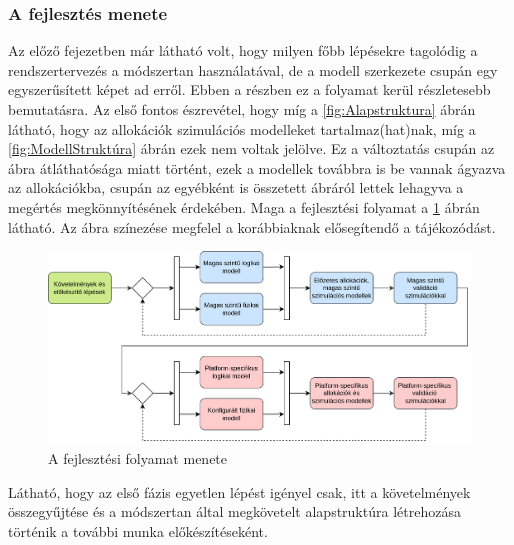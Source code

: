         \subsubsection{A fejlesztés menete} \label{sec:flow}
        Az előző fejezetben már látható volt, hogy milyen főbb lépésekre tagolódig a rendszertervezés a módszertan használatával, de a modell szerkezete csupán egy egyszerűsített képet ad erről.
        Ebben a részben ez a folyamat kerül részletesebb bemutatásra.
        Az első fontos észrevétel, hogy míg a \ref{fig:Alapstruktura} ábrán látható, hogy az allokációk szimulációs modelleket tartalmaz(hat)nak, míg a \ref{fig:ModellStruktúra} ábrán ezek nem voltak jelölve.
        Ez a változtatás csupán az ábra átláthatósága miatt történt, ezek a modellek továbbra is be vannak ágyazva az allokációkba, csupán az egyébként is összetett ábráról lettek lehagyva a megértés megkönnyítésének érdekében.
        Maga a fejlesztési folyamat a \ref{fig:Folyamat} ábrán látható. Az ábra színezése megfelel a korábbiaknak elősegítendő a tájékozódást.
        \begin{figure}[!ht]
            \centering
            \includegraphics[width=150mm, keepaspectratio]{figures/ParalelAllocationBasedFlowHU.drawio.png}
            \caption{A fejlesztési folyamat menete} 
            \label{fig:Folyamat}
        \end{figure}

        Látható, hogy az első fázis egyetlen lépést igényel csak, itt a követelmények összegyűjtése és a módszertan által megkövetelt alapstruktúra létrehozása történik a további munka előkészítéseként.
        
